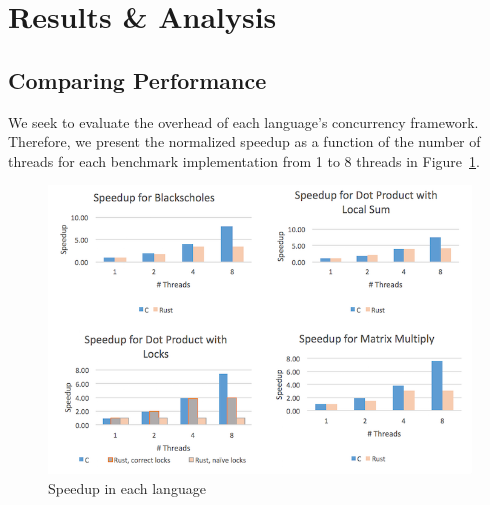 \section{Results \& Analysis}\label{sec::results}

\subsection{Comparing Performance}
We seek to evaluate the overhead of each language's concurrency framework. Therefore, we present the normalized speedup as a function of the number of threads for each benchmark implementation from 1 to 8 threads in Figure~\ref{fig:speedup}. 
\begin{figure}
\includegraphics[scale=0.4]{speedup_benchmarks}
\caption{Speedup in each language}
\label{fig:speedup}
\end{figure}

